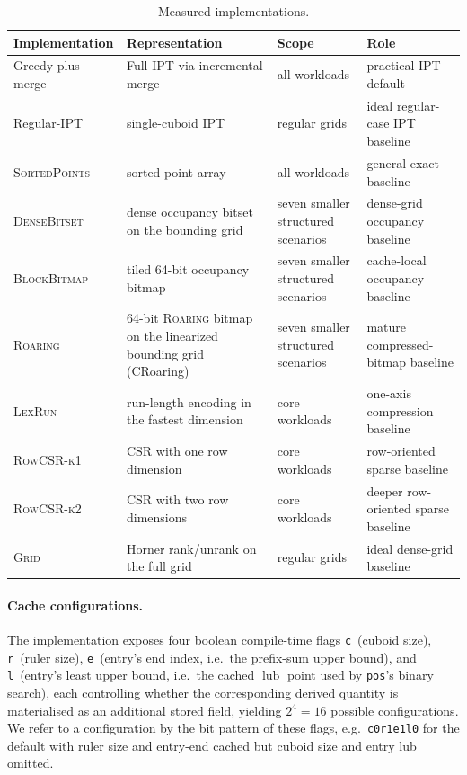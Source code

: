 \documentclass[manuscript,screen,review]{acmart}
\theoremstyle{definition}
\theoremstyle{plain}
\begin{document}
\begin{table}[ht]
\caption{Measured implementations.}
\label{table:implementations}
\small
\begin{tabular}{p{2.8cm}p{3.2cm}p{2.7cm}p{4.5cm}}
\toprule
Implementation & Representation & Scope & Role \\
\midrule
Greedy-plus-merge
  & Full IPT via incremental merge
  & all workloads
  & practical IPT default \\
Regular-IPT
  & single-cuboid IPT
  & regular grids
  & ideal regular-case IPT baseline \\
\textsc{SortedPoints}
  & sorted point array
  & all workloads
  & general exact baseline \\
\textsc{DenseBitset}
  & dense occupancy bitset on the bounding grid
  & seven smaller structured scenarios
  & dense-grid occupancy baseline \\
\textsc{BlockBitmap}
  & tiled 64-bit occupancy bitmap
  & seven smaller structured scenarios
  & cache-local occupancy baseline \\
\textsc{Roaring}
  & 64-bit \textsc{Roaring} bitmap on the linearized bounding grid
  (CRoaring)
  & seven smaller structured scenarios
  & mature compressed-bitmap baseline \\
\textsc{LexRun}
  & run-length encoding in the fastest dimension
  & core workloads
  & one-axis compression baseline \\
\textsc{RowCSR-k1}
  & CSR with one row dimension
  & core workloads
  & row-oriented sparse baseline \\
\textsc{RowCSR-k2}
  & CSR with two row dimensions
  & core workloads
  & deeper row-oriented sparse baseline \\
\textsc{Grid}
  & Horner rank/unrank on the full grid
  & regular grids
  & ideal dense-grid baseline \\
\bottomrule
\end{tabular}
\end{table}

\paragraph{Cache configurations.}
The implementation exposes four boolean compile-time flags
\texttt{c}~(cuboid size), \texttt{r}~(ruler size), \texttt{e}~(entry's
end index, i.e.\ the prefix-sum upper bound), and \texttt{l}~(entry's
least upper bound, i.e.\ the cached \(\operatorname{lub}\) point used
by \texttt{pos}'s binary search), each controlling whether the
corresponding derived quantity is materialised as an additional stored
field, yielding $2^4 = 16$ possible configurations. We refer to a
configuration by the bit pattern of these flags, e.g.\ \texttt{c0r1e1l0}
for the default with ruler size and entry-end cached but cuboid size
and entry lub omitted.
\end{document}
